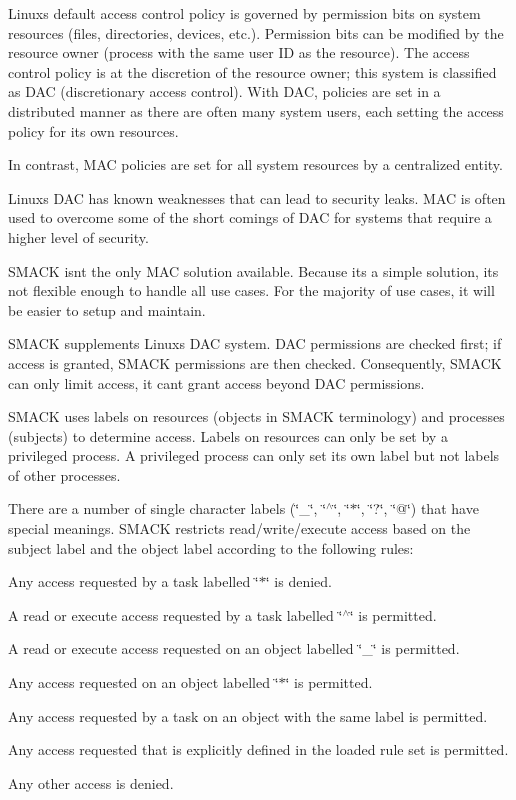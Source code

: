 Linux\textquotesingle{}s default access control policy is governed by permission bits on system resources (files, directories, devices, etc.). Permission bits can be modified by the resource owner (process with the same user I\+D as the resource). The access control policy is at the discretion of the resource owner; this system is classified as D\+A\+C (discretionary access control). With D\+A\+C, policies are set in a distributed manner as there are often many system users, each setting the access policy for its own resources.

In contrast, M\+A\+C policies are set for all system resources by a centralized entity.

Linux\textquotesingle{}s D\+A\+C has known weaknesses that can lead to security leaks. M\+A\+C is often used to overcome some of the short comings of D\+A\+C for systems that require a higher level of security.

S\+M\+A\+C\+K isn\textquotesingle{}t the only M\+A\+C solution available. Because it\textquotesingle{}s a simple solution, it\textquotesingle{}s not flexible enough to handle all use cases. For the majority of use cases, it will be easier to setup and maintain.

S\+M\+A\+C\+K supplements Linux\textquotesingle{}s D\+A\+C system. D\+A\+C permissions are checked first; if access is granted, S\+M\+A\+C\+K permissions are then checked. Consequently, S\+M\+A\+C\+K can only limit access, it can\textquotesingle{}t grant access beyond D\+A\+C permissions.

S\+M\+A\+C\+K uses \textquotesingle{}labels\textquotesingle{} on resources (objects in S\+M\+A\+C\+K terminology) and processes (subjects) to determine access. Labels on resources can only be set by a privileged process. A privileged process can only set it\textquotesingle{}s own label but not labels of other processes.

There are a number of single character labels (\char`\"{}\+\_\+\char`\"{}, \char`\"{}$^\wedge$\char`\"{}, \char`\"{}$\ast$\char`\"{}, \char`\"{}?\char`\"{}, \char`\"{}@\char`\"{}) that have special meanings. S\+M\+A\+C\+K restricts read/write/execute access based on the subject label and the object label according to the following rules\+:


\begin{DoxyEnumerate}
\item Any access requested by a task labelled \char`\"{}$\ast$\char`\"{} is denied.
\item A read or execute access requested by a task labelled \char`\"{}$^\wedge$\char`\"{} is permitted.
\item A read or execute access requested on an object labelled \char`\"{}\+\_\+\char`\"{} is permitted.
\item Any access requested on an object labelled \char`\"{}$\ast$\char`\"{} is permitted.
\item Any access requested by a task on an object with the same label is permitted.
\item Any access requested that is explicitly defined in the loaded rule set is permitted.
\item Any other access is denied.
\end{DoxyEnumerate}

